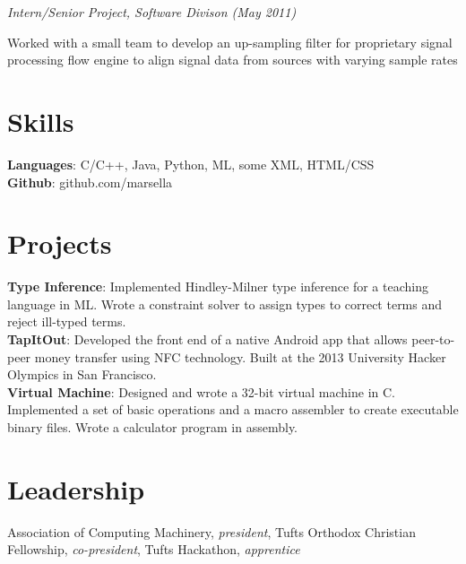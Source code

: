 \documentclass{article}
\newcommand{\position}[2]{
  \textit{#1 (#2)}
}
\newenvironment{achievements}{
  \begin{compactitem} }{
  \end{compactitem}
}
\newcommand{\skill}[2]{
  \textbf{#1}: #2
}
\begin{document}
    \position {Intern/Senior Project, Software Divison} {May 2011}
    \begin{achievements}
      \item Worked with a small team to develop an up-sampling filter for
      proprietary signal processing flow engine to align signal data from sources
      with varying sample rates
    \end{achievements}

\section*{Skills}
  \skill{Languages} {C/C++, Java, Python, ML, some XML, HTML/CSS} \\
  \skill{Github}    {github.com/marsella}

\section*{Projects}
  \skill{Type Inference}
        {Implemented Hindley-Milner type inference for a teaching language in
        ML. Wrote a constraint solver to assign types to correct terms and
        reject ill-typed terms.} \\
  \skill{TapItOut}
        {Developed the front end of a native Android app that allows
        peer-to-peer money transfer using NFC technology. Built at the 2013
        University Hacker Olympics in San Francisco.} \\
  \skill{Virtual Machine}
        {Designed and wrote a 32-bit virtual machine in C. Implemented a set of
        basic operations and a macro assembler to create executable binary
        files. Wrote a calculator program in assembly.}

\section*{Leadership}
  Association of Computing Machinery, \textit{president}, Tufts Orthodox
  Christian Fellowship, \textit{co-president}, Tufts Hackathon,
  \textit{apprentice}
\end{document}
